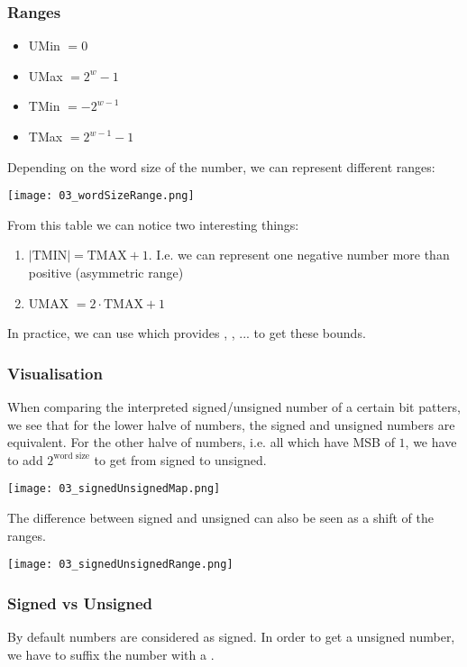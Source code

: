 \subsubsection{Ranges}
\begin{itemize}
    \item UMin $= 0$
    \item UMax $= 2^w -1$
    \item TMin $=-2^{w - 1}$
    \item TMax $=2^{w-1} - 1$
\end{itemize}

Depending on the word size of the number, we can represent different ranges:

\texttt{[image: 03\_wordSizeRange.png]}

From this table we can notice two interesting things:
\begin{enumerate}
    \item $|\text{TMIN}| = \text{TMAX} + 1$. I.e. we can represent one negative number more than positive (asymmetric range)
    \item UMAX $= 2 \cdot \text{TMAX} + 1$
\end{enumerate}

In practice, we can use  which provides , , ... to get these bounds.

\subsubsection{Visualisation}
When comparing the interpreted signed/unsigned number of a certain bit patters, we see that for the lower halve of numbers, the signed and unsigned numbers are equivalent. For the other halve of numbers, i.e. all which have MSB of $1$, we have to add $2^{\text{word size}}$ to get from signed to unsigned. 

\texttt{[image: 03\_signedUnsignedMap.png]}

The difference between signed and unsigned can also be seen as a shift of the ranges.

\texttt{[image: 03\_signedUnsignedRange.png]}

\subsubsection{Signed vs Unsigned}
By default numbers are considered as signed. In order to get a unsigned number, we have to suffix the number with a .


